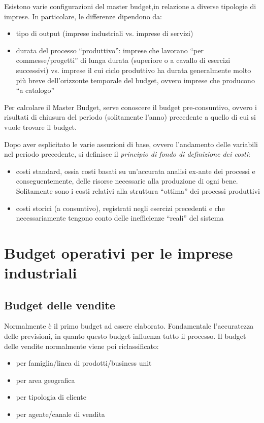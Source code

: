 Esistono varie configurazioni del master budget,in relazione a diverse tipologie di imprese.
In particolare, le differenze dipendono da:
\begin{itemize}
	\item tipo di output (imprese industriali vs. imprese di servizi)
	\item durata del processo ``produttivo'': imprese che lavorano
	``per commesse/progetti'' di lunga durata (superiore o a
	cavallo di esercizi successivi) vs. imprese il cui ciclo
	produttivo ha durata generalmente molto più breve
	dell’orizzonte temporale del budget, ovvero imprese che
	producono ``a catalogo''
\end{itemize}

Per calcolare il Master Budget, serve conoscere il budget pre-consuntivo, ovvero i risultati di chiusura
del periodo (solitamente l’anno) precedente a quello di cui si vuole trovare il budget.

Dopo aver esplicitato le varie assuzioni di base, ovvero l'andamento delle variabili nel periodo precedente, si definisce il
\emph{principio di fondo di definizione dei costi}:
\begin{itemize}
	\item costi standard, ossia costi basati su un’accurata analisi ex-ante
	dei processi e conseguentemente, delle risorse necessarie alla
	produzione di ogni bene. Solitamente sono i costi relativi alla
	struttura “ottima” dei processi produttivi
	\item costi storici (a consuntivo), registrati negli esercizi precedenti e
	che necessariamente tengono conto delle inefficienze “reali” del
	sistema
\end{itemize}

\section{Budget operativi per le imprese industriali}
\subsection{Budget delle vendite}
Normalmente è il primo budget ad essere elaborato.
Fondamentale l’accuratezza delle previsioni, in quanto questo
budget influenza tutto il processo. Il budget delle vendite normalmente viene poi riclassificato:
\begin{itemize}
	\item per famiglia/linea di prodotti/business unit
	\item per area geografica
	\item per tipologia di cliente
	\item per agente/canale di vendita
\end{itemize}

